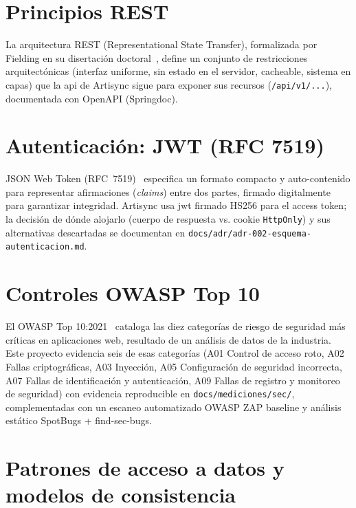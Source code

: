 \section{Principios REST}

La arquitectura REST (Representational State Transfer), formalizada por
Fielding en su disertación doctoral~\cite{FIELDING2000}, define un
conjunto de restricciones arquitectónicas (interfaz uniforme, sin estado
en el servidor, cacheable, sistema en capas) que la \gls{api} de Artisync sigue
para exponer sus recursos (\texttt{/api/v1/...}), documentada con OpenAPI
(Springdoc).

\section{Autenticación: JWT (RFC 7519)}

JSON Web Token (RFC~7519)~\cite{JWT2015} especifica un formato compacto y
auto-contenido para representar afirmaciones (\emph{claims}) entre dos
partes, firmado digitalmente para garantizar integridad. Artisync usa \gls{jwt}
firmado HS256 para el access token; la decisión de dónde alojarlo (cuerpo
de respuesta vs. cookie \texttt{HttpOnly}) y sus alternativas descartadas
se documentan en \texttt{docs/adr/adr-002-esquema-autenticacion.md}.

\section{Controles OWASP Top 10}

El OWASP Top 10:2021~\cite{OWASP2021} cataloga las diez categorías de
riesgo de seguridad más críticas en aplicaciones web, resultado de un
análisis de datos de la industria. Este proyecto evidencia seis de esas
categorías (A01 Control de acceso roto, A02 Fallas criptográficas, A03
Inyección, A05 Configuración de seguridad incorrecta, A07 Fallas de
identificación y autenticación, A09 Fallas de registro y monitoreo de
seguridad) con evidencia reproducible en \texttt{docs/mediciones/sec/},
complementadas con un escaneo automatizado OWASP ZAP baseline y análisis
estático SpotBugs + find-sec-bugs.

\section{Patrones de acceso a datos y modelos de consistencia}

